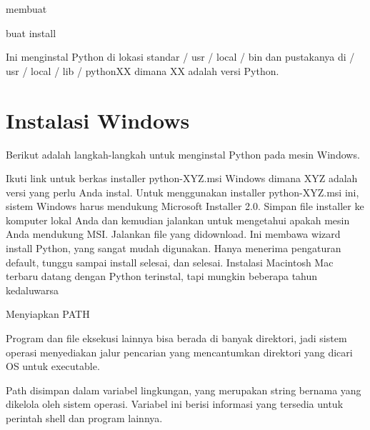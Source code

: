 {{\noindent 
{\fontsize{14pt}{14pt}\selectfont membuat \\} \par
\vspace{14pt}
\noindent 
{\fontsize{14pt}{14pt}\selectfont buat install \\} \par
\vspace{14pt}
\noindent 
{\fontsize{14pt}{14pt}\selectfont Ini menginstal Python di lokasi standar / usr / local / bin dan pustakanya di / usr / local / lib / pythonXX dimana XX adalah versi Python. \\} \par
\vspace{14pt}
\noindent 
{\fontsize{14pt}{14pt}\section {Instalasi Windows }
\noindent 
{\fontsize{14pt}{14pt}\selectfont Berikut adalah langkah-langkah untuk menginstal Python pada mesin Windows. \\} \par
\noindent 
{\fontsize{14pt}{14pt}\selectfont \vspace{\baselineskip}
Ikuti link untuk berkas installer python-XYZ.msi Windows dimana XYZ adalah versi yang perlu Anda instal. Untuk menggunakan installer python-XYZ.msi ini, sistem Windows harus mendukung Microsoft Installer 2.0. Simpan file installer ke komputer lokal Anda dan kemudian jalankan untuk mengetahui apakah mesin Anda mendukung MSI. Jalankan file yang didownload. Ini membawa wizard install Python, yang sangat mudah digunakan. Hanya menerima pengaturan default, tunggu sampai install selesai, dan selesai. Instalasi Macintosh Mac terbaru datang dengan Python terinstal, tapi mungkin beberapa tahun kedaluwarsa \\} \par
\noindent 
{\fontsize{14pt}{14pt}\selectfont Menyiapkan PATH \\} \par
\noindent 
{\fontsize{14pt}{14pt}\selectfont Program dan file eksekusi lainnya bisa berada di banyak direktori, jadi sistem operasi menyediakan jalur pencarian yang mencantumkan direktori yang dicari OS untuk executable. \\} \par
\vspace{14pt}
\noindent 
{\fontsize{14pt}{14pt}\selectfont Path disimpan dalam variabel lingkungan, yang merupakan string bernama yang dikelola oleh sistem operasi. Variabel ini berisi informasi yang tersedia untuk perintah shell dan program lainnya. \\} \par
}}}

